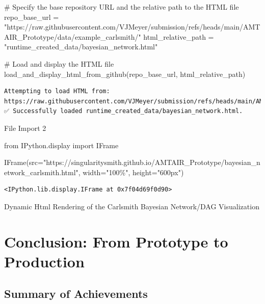 \documentclass[
  11pt,
  letterpaper,
]{book}
\newenvironment{Shaded}{\begin{snugshade}}{\end{snugshade}}
\newcommand{\CommentTok}[1]{\textcolor[rgb]{0.37,0.37,0.37}{#1}}
\newcommand{\ImportTok}[1]{\textcolor[rgb]{0.00,0.46,0.62}{#1}}
\newcommand{\NormalTok}[1]{\textcolor[rgb]{0.00,0.23,0.31}{#1}}
\newcommand{\OperatorTok}[1]{\textcolor[rgb]{0.37,0.37,0.37}{#1}}
\newcommand{\StringTok}[1]{\textcolor[rgb]{0.13,0.47,0.30}{#1}}
\begin{document}
\begin{Shaded}
\begin{Highlighting}[]
\CommentTok{\# Specify the base repository URL and the relative path to the HTML file}
\NormalTok{repo\_base\_url }\OperatorTok{=} \StringTok{"https://raw.githubusercontent.com/VJMeyer/submission/refs/heads/main/AMTAIR\_Prototype/data/example\_carlsmith/"}
\NormalTok{html\_relative\_path }\OperatorTok{=} \StringTok{"runtime\_created\_data/bayesian\_network.html"}

\CommentTok{\# Load and display the HTML file}
\NormalTok{load\_and\_display\_html\_from\_github(repo\_base\_url, html\_relative\_path)}
\end{Highlighting}
\end{Shaded}

\begin{verbatim}
Attempting to load HTML from: https://raw.githubusercontent.com/VJMeyer/submission/refs/heads/main/AMTAIR_Prototype/data/example_carlsmith//runtime_created_data/bayesian_network.html
✅ Successfully loaded runtime_created_data/bayesian_network.html.
\end{verbatim}

\label{file_import2}
File Import 2

\begin{Shaded}
\begin{Highlighting}[]
\ImportTok{from}\NormalTok{ IPython.display }\ImportTok{import}\NormalTok{ IFrame}

\NormalTok{IFrame(src}\OperatorTok{=}\StringTok{"https://singularitysmith.github.io/AMTAIR\_Prototype/bayesian\_network\_carlsmith.html"}\NormalTok{, width}\OperatorTok{=}\StringTok{"100\%"}\NormalTok{, height}\OperatorTok{=}\StringTok{"600px"}\NormalTok{)}
\end{Highlighting}
\end{Shaded}

\label{html_graph_visualization_from_githubpage}
\begin{verbatim}
<IPython.lib.display.IFrame at 0x7f04d69f0d90>
\end{verbatim}

Dynamic Html Rendering of the Carlsmith Bayesian Network/DAG
Visualization

\chapter{Conclusion: From Prototype to
Production}\label{conclusion-from-prototype-to-production}

\section{Summary of Achievements}\label{summary-of-achievements}
\end{document}
